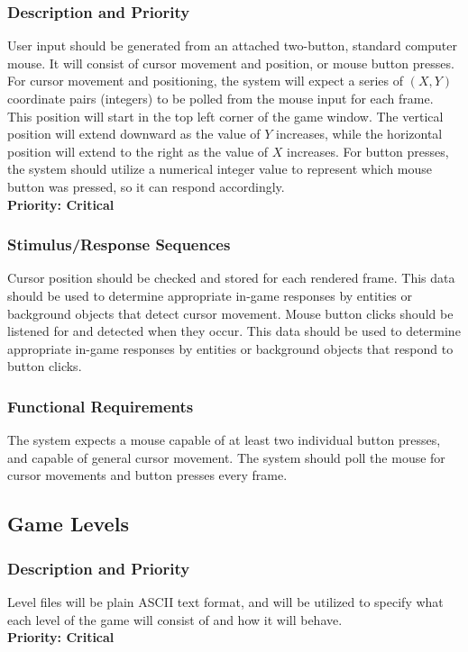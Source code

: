 \documentclass{article}
\begin{document}
		\subsubsection{Description and Priority}
			User input should be generated from an attached two-button, standard computer mouse. It will consist of cursor movement and position, or mouse button presses. For cursor movement and positioning, the system will expect a series of $(X, Y)$ coordinate pairs (integers) to be polled from the mouse input for each frame. This position will start in the top left corner of the game window. The vertical position will extend downward as the value of $Y$ increases, while the horizontal position will extend to the right as the value of $X$ increases. For button presses, the system should utilize a numerical integer value to represent which mouse button was pressed, so it can respond accordingly. \bigskip \\
			\textbf{Priority: Critical}
		\subsubsection{Stimulus/Response Sequences}
			Cursor position should be checked and stored for each rendered frame. This data should be used to determine appropriate in-game responses by entities or background objects that detect cursor movement. Mouse button clicks should be listened for and detected when they occur. This data should be used to determine appropriate in-game responses by entities or background objects that respond to button clicks. 
		\subsubsection{Functional Requirements}
			The system expects a mouse capable of at least two individual button presses, and capable of general cursor movement. The system should poll the mouse for cursor movements and button presses every frame. 
	\subsection{Game Levels}
		\subsubsection{Description and Priority}
			Level files will be plain ASCII text format, and will be utilized to specify what each level of the game will consist of and how it will behave. \bigskip \\
			\textbf{Priority: Critical}
\end{document}
